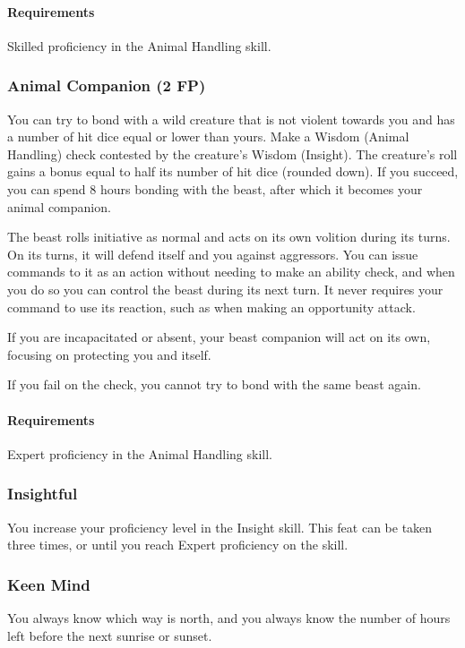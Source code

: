     \paragraph{Requirements} Skilled proficiency in the Animal Handling skill.
\subsubsection{Animal Companion (2 FP)} \label{feat::animalcompanion}
    You can try to bond with a wild creature that is not violent towards you and has a number of hit dice equal or lower than yours.
    Make a Wisdom (Animal Handling) check contested by the creature's Wisdom (Insight).
    The creature's roll gains a bonus equal to half its number of hit dice (rounded down).
    If you succeed, you can spend 8 hours bonding with the beast, after which it becomes your animal companion.

    The beast rolls initiative as normal and acts on its own volition during its turns.
    On its turns, it will defend itself and you against aggressors.
    You can issue commands to it as an action without needing to make an ability check, and when you do so you can control the beast during its next turn.
    It never requires your command to use its reaction, such as when making an opportunity attack.

    If you are incapacitated or absent, your beast companion will act on its own, focusing on protecting you and itself.

    If you fail on the check, you cannot try to bond with the same beast again.
    \paragraph{Requirements} Expert proficiency in the Animal Handling skill.
\subsubsection{Insightful} \label{feat::insightful}
    You increase your proficiency level in the Insight skill.
    This feat can be taken three times, or until you reach Expert proficiency on the skill.
\subsubsection{Keen Mind} \label{feat::keenmind}
    You always know which way is north, and you always know the number of hours left before the next sunrise or sunset.
